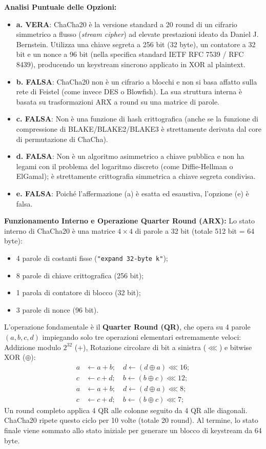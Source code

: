 \documentclass[11pt,a4paper]{article}
\begin{document}
\begin{solutionbox}
\textbf{Analisi Puntuale delle Opzioni:}
\begin{itemize}
    \item \textbf{a. VERA}: ChaCha20 \`e la versione standard a 20 round di un cifrario simmetrico a flusso (\textit{stream cipher}) ad elevate prestazioni ideato da Daniel J. Bernstein. Utilizza una chiave segreta a 256 bit (32 byte), un contatore a 32 bit e un nonce a 96 bit (nella specifica standard IETF RFC 7539 / RFC 8439), producendo un keystream sincrono applicato in XOR al plaintext.
    \item \textbf{b. FALSA}: ChaCha20 non \`e un cifrario a blocchi e non si basa affatto sulla rete di Feistel (come invece DES o Blowfish). La sua struttura interna \`e basata su trasformazioni ARX a round su una matrice di parole.
    \item \textbf{c. FALSA}: Non \`e una funzione di hash crittografica (anche se la funzione di compressione di BLAKE/BLAKE2/BLAKE3 \`e strettamente derivata dal core di permutazione di ChaCha).
    \item \textbf{d. FALSA}: Non \`e un algoritmo asimmetrico a chiave pubblica e non ha legami con il problema del logaritmo discreto (come Diffie-Hellman o ElGamal); \`e strettamente crittografia simmetrica a chiave segreta condivisa.
    \item \textbf{e. FALSA}: Poich\'e l'affermazione (a) \`e esatta ed esaustiva, l'opzione (e) \`e falsa.
\end{itemize}

\textbf{Funzionamento Interno e Operazione Quarter Round (ARX):}
Lo stato interno di ChaCha20 \`e una matrice $4 \times 4$ di parole a 32 bit (totale 512 bit = 64 byte):
\begin{itemize}
    \item 4 parole di costanti fisse (\texttt{"expand 32-byte k"});
    \item 8 parole di chiave crittografica (256 bit);
    \item 1 parola di contatore di blocco (32 bit);
    \item 3 parole di nonce (96 bit).
\end{itemize}
L'operazione fondamentale \`e il \textbf{Quarter Round (QR)}, che opera su 4 parole $(a, b, c, d)$ impiegando solo tre operazioni elementari estremamente veloci: Addizione modulo $2^{32}$ ($+$), Rotazione circolare di bit a sinistra ($\lll$) e bitwise XOR ($\oplus$):
\begin{align*}
a &\leftarrow a + b; \quad d \leftarrow (d \oplus a) \lll 16; \\
c &\leftarrow c + d; \quad b \leftarrow (b \oplus c) \lll 12; \\
a &\leftarrow a + b; \quad d \leftarrow (d \oplus a) \lll 8; \\
c &\leftarrow c + d; \quad b \leftarrow (b \oplus c) \lll 7;
\end{align*}
Un round completo applica 4 QR alle colonne seguito da 4 QR alle diagonali. ChaCha20 ripete questo ciclo per 10 volte (totale 20 round). Al termine, lo stato finale viene sommato allo stato iniziale per generare un blocco di keystream da 64 byte.


\end{solutionbox}
\end{document}
